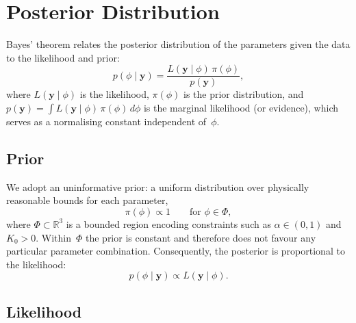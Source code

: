 \section{Posterior Distribution}\label{sec:posterior}

Bayes' theorem relates the posterior distribution of the parameters given
the data to the likelihood and prior:
\begin{equation}
  p(\phi \mid \mathbf{y})
  = \frac{L(\mathbf{y} \mid \phi)\, \pi(\phi)}{p(\mathbf{y})},
  \label{eq:bayes}
\end{equation}
where $L(\mathbf{y} \mid \phi)$ is the likelihood,
$\pi(\phi)$ is the prior distribution, and
$p(\mathbf{y}) = \int L(\mathbf{y} \mid \phi)\, \pi(\phi)\, d\phi$
is the marginal likelihood (or evidence), which serves as a normalising
constant independent of~$\phi$.

\subsection{Prior}

We adopt an uninformative prior: a uniform distribution over physically
reasonable bounds for each parameter,
\begin{equation}
  \pi(\phi) \propto 1 \qquad \text{for } \phi \in \Phi,
  \label{eq:prior}
\end{equation}
where $\Phi \subset \mathbb{R}^3$ is a bounded region encoding
constraints such as $\alpha \in (0,1)$ and $K_0 > 0$. Within~$\Phi$ the
prior is constant and therefore does not favour any particular parameter
combination. Consequently, the posterior is proportional to the
likelihood:
\begin{equation}
  p(\phi \mid \mathbf{y}) \propto L(\mathbf{y} \mid \phi).
  \label{eq:posterior-proportional}
\end{equation}

\subsection{Likelihood}

